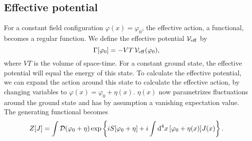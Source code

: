 \subsection{Effective potential}

For a constant field configuration $\varphi(x) = \varphi_0$, the effective action, a functional, becomes a regular function.
We define the effective potential $\mathcal{V}_{\mathrm{eff}}$ by
%
\begin{equation}
    \label{definition effective potential}
    \Gamma[\varphi_0] = - V T \, \mathcal{V}_{\mathrm{eff}}(\varphi_0),
\end{equation}
%
where $VT$ is the volume of space-time.
For a constant ground state, the effective potential will equal the energy of this state.
To calculate the effective potential, we can expand the action around this state to calculate the effective action,
by changing variables to $\varphi(x) = \varphi_0 + \eta(x)$.
$\eta(x)$ now parametrizes fluctuations around the ground state and has by assumption a vanishing expectation value.
The generating functional becomes
%
\begin{align}
    Z[J] 
    = \int \mathcal D (\varphi_0 + \eta) \, 
    \text{exp} \left\{ i S[\varphi_0 + \eta] + i \int \text{d}^4 x\, [\varphi_0 + \eta(x)] J(x)  \right\}.
\end{align}

